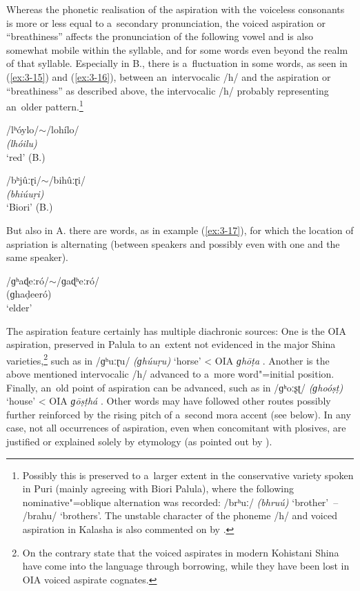 Whereas the phonetic realisation of the aspiration with the voiceless consonants is more or less equal to a~secondary pronunciation, the voiced aspiration or ``breathiness'' affects the pronunciation of the following vowel and is also somewhat mobile within the syllable, and for some words even beyond the realm of that syllable. Especially in B., there is a~fluctuation in some words, as seen in (\ref{ex:3-15}) and (\ref{ex:3-16}), between an~intervocalic /h/ and the aspiration or ``breathiness'' as described above, the intervocalic /h/ probably representing an~older pattern.\footnote{Possibly this is preserved to a~larger extent in the conservative variety spoken in Puri (mainly agreeing with Biori Palula), where the following nominative"=oblique alternation was recorded: /brʰuː/ \textit{(bhruú)} `brother'~-- /brahu/ `brothers'. The unstable character of the phoneme /h/ and voiced aspiration in Kalasha is also commented on by \citet[50]{morchheegaard1997}.}

\begin{exe}
\extab
\label{ex:3-15}
/lʰóylo/$\sim$/lohílo/ \\
\textit{(lhóilu)} \\
`red' (B.)

\extab
\label{ex:3-16}
/bʰjûːɽi/$\sim$/bihûːɽi/ \\
\textit{(bhiúuṛi)} \\
`Biori' (B.)
\end{exe}

But also in A. there are words, as in example (\ref{ex:3-17}), for which the location of aspriation is alternating (between speakers and possibly even with one and the same speaker).

\begin{exe}
\extab
\label{ex:3-17}
/ɡʰaɖeːró/$\sim$/ɡaɖʰeːró/ \\
(ɡhaḍeeró) \\
`elder'
\end{exe}

The aspiration feature certainly has multiple diachronic sources: One is the OIA aspiration, preserved in Palula to an~extent not evidenced in the major Shina varieties,\footnote{On the contrary \citet[30]{schmidtkohistani2008} state that the voiced aspirates in modern Kohistani Shina have come into the language through borrowing, while they have been lost in OIA voiced aspirate cognates.} such as in /ɡʰuːɽu/ \textit{(ɡhúuṛu)} `horse' {\textless} OIA \textit{ɡhōṭa} \citep[4516]{turner1966}. Another is the above mentioned intervocalic /h/ advanced to a~more word"=initial position. Finally, an~old point of aspiration can be advanced, such as in /ɡʰoːʂʈ/ \textit{(ɡhoóṣṭ)} `house' {\textless} OIA \textit{ɡōṣṭhá} \citep[4336]{turner1966}. Other words may have followed other routes possibly further reinforced by the rising pitch of a~second mora accent (see  below). In any case, not all occurrences of aspiration, even when concomitant with plosives, are justified or explained solely by etymology (as pointed out by \citealt[57]{morgenstierne1932}).


